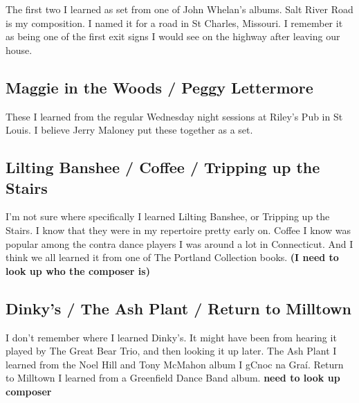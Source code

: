 \documentclass[11pt,letterpaper]{article}
\begin{document}
The first two I learned as set from one of John Whelan's albums. Salt River Road is my composition. I named it for a road in St Charles, Missouri. I remember it as being one of the first exit signs I would see on the highway after leaving our house. 

\subsection*{Maggie in the Woods / Peggy Lettermore}

These I learned from the regular Wednesday night sessions at Riley's Pub in St Louis. I believe Jerry Maloney put these together as a set. 

\subsection*{Lilting Banshee / Coffee / Tripping up the Stairs}

I'm not sure where specifically I learned Lilting Banshee, or Tripping up the Stairs. I know that they were in my repertoire pretty early on. Coffee I know was popular among the contra dance players I was around a lot in Connecticut. And I think we all learned it from one of The Portland Collection books. \textbf{(I need to look up who the composer is)}

\subsection*{Dinky's / The Ash Plant / Return to Milltown}

I don't remember where I learned Dinky's. It might have been from hearing it played by The Great Bear Trio, and then looking it up later. The Ash Plant I learned from the Noel Hill and Tony McMahon album I gCnoc na Graí. Return to Milltown I learned from a Greenfield Dance Band album. \textbf{need to look up composer}
\end{document}

